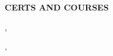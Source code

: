 %
%
%
%
%



\vspace{\spaceBeforeSection}
\textbf{CERTS AND COURSES} \hrulefill
\vspace{\spaceAfterSection}


    \href{\certScrumMasterUrl}{\certScrumMasterBreak}

    \begin{small}
        \certScrumMasterWho, \ \certScrumMasterWhen
    \end{small}


    \medskip

    \href{\certCookiesUrl}{\certCookiesBreak}

    \begin{small}
        \certCookiesWho, \ \certCookiesWhen
    \end{small}


